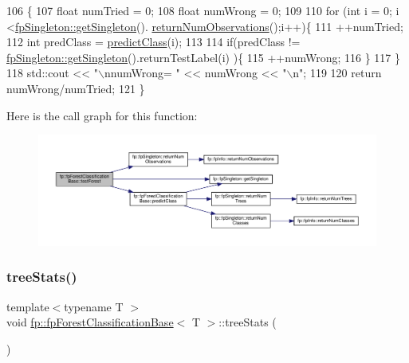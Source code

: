 \begin{DoxyCode}
106                               \{
107                 \textcolor{keywordtype}{float} numTried = 0;
108                 \textcolor{keywordtype}{float} numWrong = 0;
109 
110                 \textcolor{keywordflow}{for} (\textcolor{keywordtype}{int} i = 0; i <\hyperlink{classfp_1_1fpSingleton_a8bdae77b68521003e3fc630edec2e240}{fpSingleton::getSingleton}().
      \hyperlink{classfp_1_1fpSingleton_ae12f22ad096ff0d419fce47df710bf78}{returnNumObservations}();i++)\{
111                     ++numTried;
112                     \textcolor{keywordtype}{int} predClass = \hyperlink{classfp_1_1fpForestClassificationBase_ad0c690fff971fab681467fbcd8762b5f}{predictClass}(i);
113 
114                     \textcolor{keywordflow}{if}(predClass != \hyperlink{classfp_1_1fpSingleton_a8bdae77b68521003e3fc630edec2e240}{fpSingleton::getSingleton}().returnTestLabel(i)
      )\{
115                         ++numWrong;
116                     \}
117                 \}
118                 std::cout << \textcolor{stringliteral}{"\(\backslash\)nnumWrong= "} << numWrong << \textcolor{stringliteral}{"\(\backslash\)n"};
119 
120                 \textcolor{keywordflow}{return} numWrong/numTried;
121             \}
\end{DoxyCode}
Here is the call graph for this function\+:\nopagebreak
\begin{figure}[H]
\begin{center}
\leavevmode
\includegraphics[width=350pt]{classfp_1_1fpForestClassificationBase_a3f1ad5a5cfb3633713d0a81bd1c356e8_cgraph}
\end{center}
\end{figure}
\mbox{\label{classfp_1_1fpForestClassificationBase_a48567d379434daeccb1540c84674d286}} 
\subsubsection{\texorpdfstring{tree\+Stats()}{treeStats()}}
{\footnotesize\ttfamily template$<$typename T $>$ \\
void \hyperlink{classfp_1_1fpForestClassificationBase}{fp\+::fp\+Forest\+Classification\+Base}$<$ T $>$\+::tree\+Stats (\begin{DoxyParamCaption}{ }\end{DoxyParamCaption})\hspace{0.3cm}{\ttfamily [inline]}}



